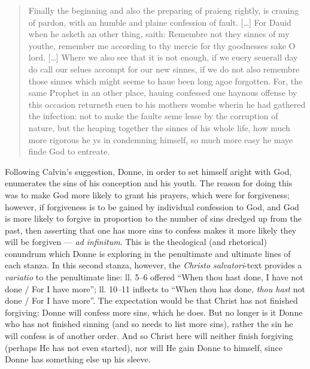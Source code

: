 \begin{paper}
\begin{quote}
Finally the beginning and also the preparing of praieng rightly, is
crauing of pardon, with an humble and plaine confession of fault.
{[}\ldots{}{]} For Dauid when he asketh an other thing, saith: Remembre
not they sinnes of my youthe, remember me according to thy mercie for
thy goodnesses sake O lord. {[}\ldots{}{]} Where we also see that it is
not enough, if we euery seuerall day do call our selues accompt for our
new sinnes, if we do not also remembre those sinnes which might seeme to
haue been long agoe forgotten. For, the same Prophet in an other place,
hauing confessed one haynous offense by this occasion returneth euen to
his mothers wombe wherin he had gathered the infection: not to make the
faulte seme lesse by the corruption of nature, but the heaping together
the sinnes of his whole life, how much more rigorous he ys in condemning
himself, so much more easy he maye finde God to entreate.
\begin{flushright}
\citep[207v]{calvin_institution_1561}
\end{flushright}
\end{quote}

\noindent Following Calvin's suggestion, Donne, in order to set himself aright
with God, enumerates the sins of his conception and his youth. The
reason for doing this was to make God more likely to grant his prayers,
which were for forgiveness; however, if forgiveness is to be gained by
individual confession to God, and God is more likely to forgive in
proportion to the number of sins dredged up from the past, then
asserting that one has more sins to confess makes it more likely they
will be forgiven --- \emph{ad infinitum}. This is the theological (and
rhetorical) conundrum which Donne is exploring in the penultimate and
ultimate lines of each stanza. In this second stanza, however, the
\emph{Christo salvatori}-text provides a \emph{variatio} to the
penultimate line: ll. 5--6 offered ``When thou hast done, I have not
done / For I have more''; ll. 10--11 inflects to ``When thou has done,
\emph{thou hast} not done / For I have more''. The expectation would be
that Christ has not finished forgiving: Donne will confess more sins,
which he does. But no longer is it Donne who has not finished sinning
(and so needs to list more sins), rather the sin he will confess is of
another order. And so Christ here will neither finish forgiving (perhaps
He has not even started), nor will He gain Donne to himself, since Donne
has something else up his sleeve.


\end{paper}

